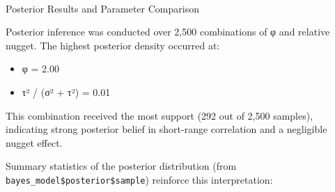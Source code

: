 \documentclass[
  11pt,
]{article}
\makeatletter
\let\oldparagraph\paragraph
\renewcommand{\paragraph}{
    \@ifstar
      \xxxParagraphStar
      \xxxParagraphNoStar
  }
\newcommand{\xxxParagraphStar}[1]{\oldparagraph*{#1}\mbox{}}
\newcommand{\xxxParagraphNoStar}[1]{\oldparagraph{#1}\mbox{}}
\newenvironment{Shaded}{\begin{snugshade}}{\end{snugshade}}
\newcommand{\AttributeTok}[1]{\textcolor[rgb]{0.40,0.45,0.13}{#1}}
\newcommand{\DecValTok}[1]{\textcolor[rgb]{0.68,0.00,0.00}{#1}}
\newcommand{\FloatTok}[1]{\textcolor[rgb]{0.68,0.00,0.00}{#1}}
\newcommand{\FunctionTok}[1]{\textcolor[rgb]{0.28,0.35,0.67}{#1}}
\newcommand{\NormalTok}[1]{\textcolor[rgb]{0.00,0.23,0.31}{#1}}
\newcommand{\OtherTok}[1]{\textcolor[rgb]{0.00,0.23,0.31}{#1}}
\newcommand{\SpecialCharTok}[1]{\textcolor[rgb]{0.37,0.37,0.37}{#1}}
\newcommand{\StringTok}[1]{\textcolor[rgb]{0.13,0.47,0.30}{#1}}
\providecommand{\tightlist}{%
  \setlength{\itemsep}{0pt}\setlength{\parskip}{0pt}}\usepackage{longtable,booktabs,array}
\makeatother
\begin{document}
\begin{Shaded}
\end{Shaded}

\paragraph{Posterior Results and Parameter
Comparison}\label{posterior-results-and-parameter-comparison}

Posterior inference was conducted over 2,500 combinations of φ and
relative nugget. The highest posterior density occurred at:

\begin{itemize}
\tightlist
\item
  φ = 2.00\\
\item
  τ² / (σ² + τ²) = 0.01
\end{itemize}

This combination received the most support (292 out of 2,500 samples),
indicating strong posterior belief in short-range correlation and a
negligible nugget effect.

Summary statistics of the posterior distribution (from
\texttt{bayes\_model\$posterior\$sample}) reinforce this interpretation:
\end{document}
